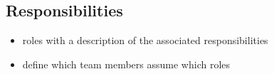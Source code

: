 \subsection{Responsibilities}

\begin{itemize}
    \item roles with a description of the associated responsibilities
    \item define which team members assume which roles
\end{itemize}
